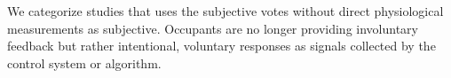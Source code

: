 
We categorize studies that uses the subjective votes without direct physiological measurements as subjective. Occupants are no longer providing involuntary feedback but rather intentional, voluntary responses as signals collected by the control system or algorithm.



